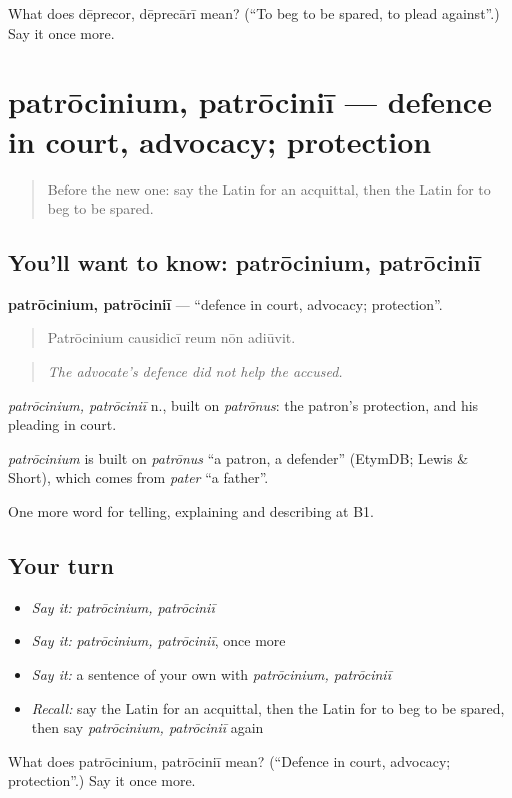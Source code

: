 \begin{tcolorbox}[breakable,colback=teal!4,colframe=teal!35!black,title={Before you move on}]
What does dēprecor, dēprecārī mean? (\textquotedblleft{}To beg to be spared, to plead against\textquotedblright{}.) Say it once more.
\end{tcolorbox}
\section[patrōcinium, patrōciniī]{patrōcinium, patrōciniī — defence in court, advocacy; protection}

\label{lesson:LA-C413-patrocinium}



\begin{quote}
Before the new one: say the Latin for an acquittal, then the Latin for to beg to be spared.
\end{quote}

\subsection*{You'll want to know: patrōcinium, patrōciniī}
\textbf{patrōcinium, patrōciniī} — \textquotedblleft{}defence in court, advocacy; protection\textquotedblright{}.

\begin{quote}
Patrōcinium causidicī reum nōn adiūvit.
\end{quote}

\begin{quote}
\emph{The advocate's defence did not help the accused.}
\end{quote}

\emph{patrōcinium, patrōciniī} n., built on \emph{patrōnus}: the patron's protection, and his pleading in court.

\begin{cousinweb}
\emph{patrōcinium} is built on \emph{patrōnus} \textquotedblleft{}a patron, a defender\textquotedblright{} (EtymDB; Lewis \& Short), which comes from \emph{pater} \textquotedblleft{}a father\textquotedblright{}.
\end{cousinweb}

\begin{grammarlens}[title={What you've built}]
One more word for telling, explaining and describing at B1.
\end{grammarlens}

\subsection*{Your turn}
\begin{itemize}
\raggedright
  \item \emph{Say it:} \emph{patrōcinium, patrōciniī}
  \item \emph{Say it:} \emph{patrōcinium, patrōciniī}, once more
  \item \emph{Say it:} a sentence of your own with \emph{patrōcinium, patrōciniī}
  \item \emph{Recall:} say the Latin for an acquittal, then the Latin for to beg to be spared, then say \emph{patrōcinium, patrōciniī} again
\end{itemize}

\begin{tcolorbox}[breakable,colback=teal!4,colframe=teal!35!black,title={Before you move on}]
What does patrōcinium, patrōciniī mean? (\textquotedblleft{}Defence in court, advocacy; protection\textquotedblright{}.) Say it once more.
\end{tcolorbox}
